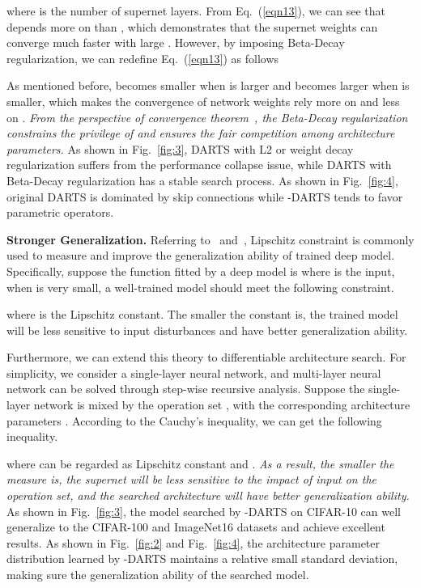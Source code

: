 \documentclass[10pt,twocolumn,letterpaper]{article}
\begin{document}
where  is the number of supernet layers. From Eq.~(\ref{eqn13}), we can see that  depends more on  than , which demonstrates that the supernet weights can converge much faster with large . However, by imposing Beta-Decay regularization, we can redefine Eq.~(\ref{eqn13}) as follows

As mentioned before,  becomes smaller when  is larger and  becomes larger when  is smaller, which makes the convergence of network weights rely more on  and less on . \textit{From the perspective of convergence theorem}~\cite{prdarts}\textit{, the Beta-Decay regularization constrains the privilege of  and ensures the fair competition among architecture parameters.} As shown in Fig.~\ref{fig:3}, DARTS with L2 or weight decay regularization suffers from the performance collapse issue, while DARTS with Beta-Decay regularization has a stable search process. As shown in Fig.~\ref{fig:4}, original DARTS is dominated by skip connections while -DARTS tends to favor parametric operators.

\noindent\textbf{Stronger Generalization.} Referring to~\cite{neyshabur2017exploring} and~\cite{finlay2018lipschitz}, Lipschitz constraint is commonly used to measure and improve the generalization ability of trained deep model. Specifically, suppose the function fitted by a deep model is  where  is the input, when  is very small, a well-trained model should meet the following constraint.

where  is the Lipschitz constant. The smaller the constant is, the trained model will be less sensitive to input disturbances and have better generalization ability. 

Furthermore, we can extend this theory to differentiable architecture search. For simplicity, we consider a single-layer neural network, and multi-layer neural network can be solved through step-wise recursive analysis. Suppose the single-layer network is mixed by the operation set , with the corresponding architecture parameters . According to the Cauchy's inequality, we can get the following inequality.

where  can be regarded as Lipschitz constant and . \textit{As a result, the smaller the measure  is, the supernet will be less sensitive to the impact of input on the operation set, and the searched architecture will have better generalization ability.} As shown in Fig.~\ref{fig:3}, the model searched by -DARTS on CIFAR-10 can well generalize to the CIFAR-100 and ImageNet16 datasets and achieve excellent results. As shown in Fig.~\ref{fig:2} and Fig.~\ref{fig:4}, the architecture parameter distribution learned by -DARTS maintains a relative small standard deviation, making sure the generalization ability of the searched model.
\end{document}
